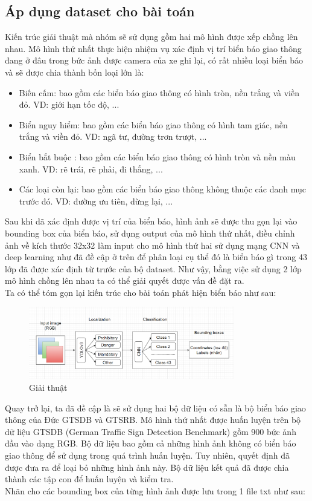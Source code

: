 \subsection{Áp dụng dataset cho bài toán}
Kiến trúc giải thuật mà nhóm sẽ sử dụng  gồm hai mô hình được xếp chồng lên nhau. Mô hình thứ nhất thực hiện nhiệm vụ xác định vị trí biển báo giao thông đang ở đâu trong bức ảnh được camera của xe ghi lại, có rất nhiều loại biển báo và sẽ được chia thành bốn loại lớn là:
\begin{itemize}
    \item Biến cấm: bao gồm các biển báo giao thông có hình tròn, nền trắng và viền đỏ. VD: giới hạn tốc độ, ... 
    \item Biển nguy hiểm: bao gồm các biển báo giao thông có hình tam giác, nền trắng và viền đỏ. VD: ngã tư, đường trơn trượt, ... 
    \item Biển bắt buộc : bao gồm các biển báo giao thông có hình tròn và nền màu xanh. VD: rẽ trái, rẽ phải, đi thẳng, ... 
    \item Các loại còn lại: bao gồm các biển báo giao thông không thuộc các danh mục trước đó. VD: đường ưu tiên, dừng lại, ... 
\end{itemize}
Sau khi dã xác định được vị trí của biển báo, hình ảnh sẽ được thu gọn lại vào bounding box của biển báo, sử dụng output của mô hình thứ nhất, điều chỉnh ảnh về kích thước 32x32 làm input cho mô hình thứ hai sử dụng mạng CNN và deep learning như đã đề cập ở trên để phân loại cụ thể đó là biển báo gì trong 43 lớp đã được xác định từ trước của bộ dataset. Như vậy, bằng việc sử dụng 2 lớp mô hình chồng lên nhau ta có thể giải quyết được vấn đề đặt ra.\\
Ta có thể tóm gọn lại kiến trúc cho bài toán phát hiện biển báo như sau:
\begin{figure}[htp]
    \centering
    \includegraphics[width=0.8\textwidth]{images/2c-sign/sign-sys.png}
    \caption{Giải thuật}
    \label{fig:algo}
\end{figure}

\noindent Quay trở lại, ta đã đề cập là sẽ sử dụng hai bộ dữ liệu có sẵn là bộ biển báo giao thông của Đức GTSDB và GTSRB. Mô hình thứ nhất được huấn luyện trên bộ dữ liệu GTSDB (German Traffic Sign Detection Benchmark) gồm 900 bức ảnh đầu vào dạng RGB. Bộ dữ liệu bao gồm cả những hình ảnh không có biển báo giao thông để sử dụng trong quá trình huấn luyện. Tuy nhiên, quyết định đã được đưa ra để loại bỏ những hình ảnh này. Bộ dữ liệu kết quả đã được chia thành các tập con để huấn luyện và kiểm tra. \\
\newline
Nhãn cho các bounding box của từng hình ảnh được lưu trong 1 file txt như sau:

